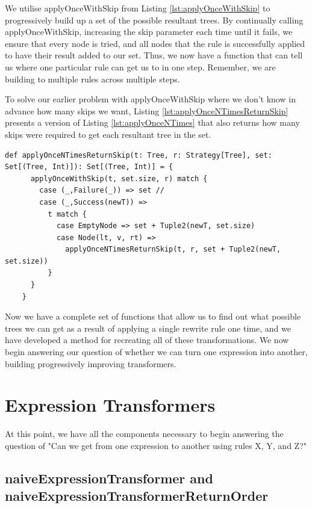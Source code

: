 \documentclass{l4proj}
\begin{document}
We utilise applyOnceWithSkip from Listing \ref{lst:applyOnceWithSkip} to progressively build up a set of the possible resultant trees. By continually calling applyOnceWithSkip, increasing the skip parameter each time until it fails, we ensure that every node is tried, and all nodes that the rule is successfully applied to have their result added to our set. 
Thus, we now have a function that can tell us where one particular rule can get us to in one step. Remember, we are building to multiple rules across multiple steps.



To solve our earlier problem with applyOnceWithSkip where we don't know in advance how many skips we want, Listing \ref{lst:applyOnceNTimesReturnSkip} presents a version of Listing \ref{lst:applyOnceNTimes} that also returns how many skips were required to get each resultant tree in the set.

\begin{lstlisting}[caption={The same as Listing \ref{lst:applyOnceNTimes}, except that we return how many skips each resultant tree took to achieve}, label={lst:applyOnceNTimesReturnSkip}]
    def applyOnceNTimesReturnSkip(t: Tree, r: Strategy[Tree], set: Set[(Tree, Int)]): Set[(Tree, Int)] = {
      applyOnceWithSkip(t, set.size, r) match {
        case (_,Failure(_)) => set //
        case (_,Success(newT)) =>
          t match {
            case EmptyNode => set + Tuple2(newT, set.size)
            case Node(lt, v, rt) =>
              applyOnceNTimesReturnSkip(t, r, set + Tuple2(newT, set.size))
          }
      }
    }
\end{lstlisting}

Now we have a complete set of functions that allow us to find out what possible trees we can get as a result of applying a single rewrite rule one time, and we have developed a method for recreating all of these transformations. 
We now begin answering our question of whether we can turn one expression into another, building progressively improving transformers.



\section{Expression Transformers}

At this point, we have all the components necessary to begin answering the question of "Can we get from one expression to another using rules X, Y, and Z?"

\subsection{naiveExpressionTransformer and naiveExpressionTransformerReturnOrder}
\end{document}
